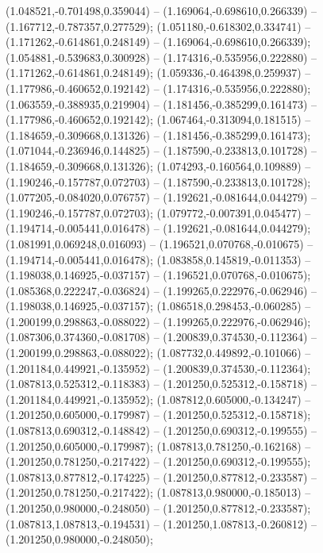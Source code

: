  (1.048521,-0.701498,0.359044) -- (1.169064,-0.698610,0.266339) -- (1.167712,-0.787357,0.277529);
 (1.051180,-0.618302,0.334741) -- (1.171262,-0.614861,0.248149) -- (1.169064,-0.698610,0.266339);
 (1.054881,-0.539683,0.300928) -- (1.174316,-0.535956,0.222880) -- (1.171262,-0.614861,0.248149);
 (1.059336,-0.464398,0.259937) -- (1.177986,-0.460652,0.192142) -- (1.174316,-0.535956,0.222880);
 (1.063559,-0.388935,0.219904) -- (1.181456,-0.385299,0.161473) -- (1.177986,-0.460652,0.192142);
 (1.067464,-0.313094,0.181515) -- (1.184659,-0.309668,0.131326) -- (1.181456,-0.385299,0.161473);
 (1.071044,-0.236946,0.144825) -- (1.187590,-0.233813,0.101728) -- (1.184659,-0.309668,0.131326);
 (1.074293,-0.160564,0.109889) -- (1.190246,-0.157787,0.072703) -- (1.187590,-0.233813,0.101728);
 (1.077205,-0.084020,0.076757) -- (1.192621,-0.081644,0.044279) -- (1.190246,-0.157787,0.072703);
 (1.079772,-0.007391,0.045477) -- (1.194714,-0.005441,0.016478) -- (1.192621,-0.081644,0.044279);
 (1.081991,0.069248,0.016093) -- (1.196521,0.070768,-0.010675) -- (1.194714,-0.005441,0.016478);
 (1.083858,0.145819,-0.011353) -- (1.198038,0.146925,-0.037157) -- (1.196521,0.070768,-0.010675);
 (1.085368,0.222247,-0.036824) -- (1.199265,0.222976,-0.062946) -- (1.198038,0.146925,-0.037157);
 (1.086518,0.298453,-0.060285) -- (1.200199,0.298863,-0.088022) -- (1.199265,0.222976,-0.062946);
 (1.087306,0.374360,-0.081708) -- (1.200839,0.374530,-0.112364) -- (1.200199,0.298863,-0.088022);
 (1.087732,0.449892,-0.101066) -- (1.201184,0.449921,-0.135952) -- (1.200839,0.374530,-0.112364);
 (1.087813,0.525312,-0.118383) -- (1.201250,0.525312,-0.158718) -- (1.201184,0.449921,-0.135952);
 (1.087812,0.605000,-0.134247) -- (1.201250,0.605000,-0.179987) -- (1.201250,0.525312,-0.158718);
 (1.087813,0.690312,-0.148842) -- (1.201250,0.690312,-0.199555) -- (1.201250,0.605000,-0.179987);
 (1.087813,0.781250,-0.162168) -- (1.201250,0.781250,-0.217422) -- (1.201250,0.690312,-0.199555);
 (1.087813,0.877812,-0.174225) -- (1.201250,0.877812,-0.233587) -- (1.201250,0.781250,-0.217422);
 (1.087813,0.980000,-0.185013) -- (1.201250,0.980000,-0.248050) -- (1.201250,0.877812,-0.233587);
 (1.087813,1.087813,-0.194531) -- (1.201250,1.087813,-0.260812) -- (1.201250,0.980000,-0.248050);
